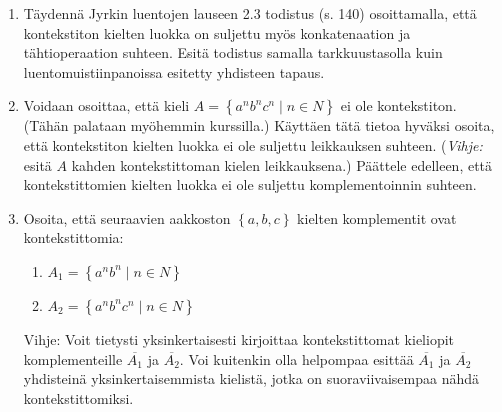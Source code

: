 \documentclass[a4paper,11pt]{article}
\newcommand{\set}[1]{{\left\{ #1 \right\}}}
\begin{document}
\begin{enumerate}
\item
Täydennä Jyrkin luentojen lauseen 2.3 todistus (s. 140)
osoittamalla, että kontekstiton kielten luokka on suljettu
myös konkatenaation ja tähtioperaation suhteen.
Esitä todistus samalla tarkkuustasolla kuin luentomuistiinpanoissa
esitetty yhdisteen tapaus.


\item
Voidaan osoittaa, että kieli $A=\set{ a^n b^n c^n\mid n\in N}$
ei ole kontekstiton.
(Tähän palataan myöhemmin kurssilla.)
Käyttäen tätä tietoa hyväksi osoita, että
kontekstiton kielten luokka ei ole suljettu leikkauksen suhteen.
({\em Vihje:} esitä $A$ kahden kontekstittoman kielen leikkauksena.)
Päättele edelleen, että kontekstittomien kielten luokka
ei ole suljettu komplementoinnin suhteen.



\item
Osoita, että seuraavien aakkoston $\set{a,b,c}$ kielten komplementit ovat kontekstittomia:
\begin{enumerate}
\item $A_1=\set{ a^n b^n \mid n \in N}$
\item $A_2=\set{ a^n b^n c^n\mid n \in N}$
\end{enumerate}

Vihje: Voit tietysti yksinkertaisesti kirjoittaa kontekstittomat  kieliopit komplementeille $\overline{A_1}$ ja $\overline{A_2}$. Voi kuitenkin
olla helpompaa esittää $\overline{A_1}$ ja $\overline{A_2}$ yhdisteinä yksinkertaisemmista kielistä, jotka on suoraviivaisempaa
nähdä kontekstittomiksi.

%





\end{enumerate}
\end{document}

